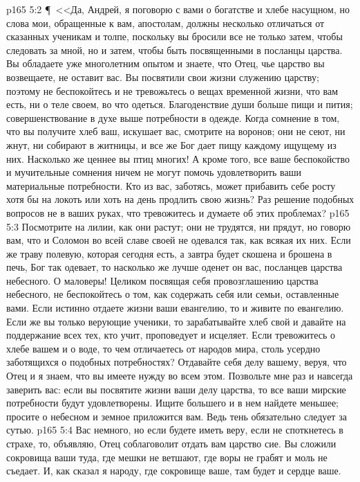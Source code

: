\vs p165 5:2 \P\ <<Да, Андрей, я поговорю с вами о богатстве и хлебе насущном, но слова мои, обращенные к вам, апостолам, должны несколько отличаться от сказанных ученикам и толпе, поскольку вы бросили все не только затем, чтобы следовать за мной, но и затем, чтобы быть посвященными в посланцы царства. Вы обладаете уже многолетним опытом и знаете, что Отец, чье царство вы возвещаете, не оставит вас. Вы посвятили свои жизни служению царству; поэтому не беспокойтесь и не тревожьтесь о вещах временной жизни, что вам есть, ни о теле своем, во что одеться. Благоденствие души больше пищи и пития; совершенствование в духе выше потребности в одежде. Когда сомнение в том, что вы получите хлеб ваш, искушает вас, смотрите на воронов; они не сеют, ни жнут, ни собирают в житницы, и все же Бог дает пищу каждому ищущему из них. Насколько же ценнее вы птиц многих! А кроме того, все ваше беспокойство и мучительные сомнения ничем не могут помочь удовлетворить ваши материальные потребности. Кто из вас, заботясь, может прибавить себе росту хотя бы на локоть или хоть на день продлить свою жизнь? Раз решение подобных вопросов не в ваших руках, что тревожитесь и думаете об этих проблемах?
\vs p165 5:3 Посмотрите на лилии, как они растут; они не трудятся, ни прядут, но говорю вам, что и Соломон во всей славе своей не одевался так, как всякая их них. Если же траву полевую, которая сегодня есть, а завтра будет скошена и брошена в печь, Бог так одевает, то насколько же лучше оденет он вас, посланцев царства небесного. О маловеры! Целиком посвящая себя провозглашению царства небесного, не беспокойтесь о том, как содержать себя или семьи, оставленные вами. Если истинно отдаете жизни ваши евангелию, то и живите по евангелию. Если же вы только верующие ученики, то зарабатывайте хлеб свой и давайте на поддержание всех тех, кто учит, проповедует и исцеляет. Если тревожитесь о хлебе вашем и о воде, то чем отличаетесь от народов мира, столь усердно заботящихся о подобных потребностях? Отдавайте себя делу вашему, веруя, что Отец и я знаем, что вы имеете нужду во всем этом. Позвольте мне раз и навсегда заверить вас: если вы посвятите жизни ваши делу царства, то все ваши мирские потребности будут удовлетворены. Ищите большего и в нем найдете меньшее; просите о небесном и земное приложится вам. Ведь тень обязательно следует за сутью.
\vs p165 5:4 Вас немного, но если будете иметь веру, если не споткнетесь в страхе, то, объявляю, Отец соблаговолит отдать вам царство сие. Вы сложили сокровища ваши туда, где мешки не ветшают, где воры не грабят и моль не съедает. И, как сказал я народу, где сокровище ваше, там будет и сердце ваше.
